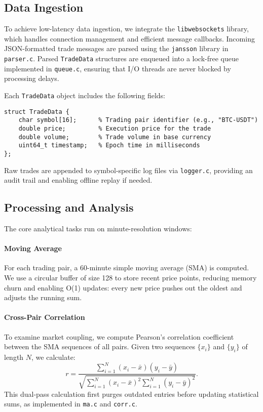 \documentclass{article}
\begin{document}
\subsection{Data Ingestion}
To achieve low-latency data ingestion, we integrate the \texttt{libwebsockets} library, which handles connection management and efficient message callbacks. Incoming JSON-formatted trade messages are parsed using the \texttt{jansson} library in \texttt{parser.c}. Parsed \texttt{TradeData} structures are enqueued into a lock-free queue implemented in \texttt{queue.c}, ensuring that I/O threads are never blocked by processing delays.

Each \texttt{TradeData} object includes the following fields:
\begin{verbatim}
struct TradeData {
    char symbol[16];      % Trading pair identifier (e.g., "BTC-USDT")
    double price;         % Execution price for the trade
    double volume;        % Trade volume in base currency
    uint64_t timestamp;   % Epoch time in milliseconds
};
\end{verbatim}
Raw trades are appended to symbol-specific log files via \texttt{logger.c}, providing an audit trail and enabling offline replay if needed.

\subsection{Processing and Analysis}
The core analytical tasks run on minute-resolution windows:

\paragraph{Moving Average} For each trading pair, a 60-minute simple moving average (SMA) is computed. We use a circular buffer of size 128 to store recent price points, reducing memory churn and enabling O(1) updates: every new price pushes out the oldest and adjusts the running sum.

\paragraph{Cross-Pair Correlation} To examine market coupling, we compute Pearson's correlation coefficient between the SMA sequences of all pairs. Given two sequences $\{x_i\}$ and $\{y_i\}$ of length $N$, we calculate:
\[
r = \frac{\sum_{i=1}^N (x_i - \bar{x})(y_i - \bar{y})}{\sqrt{\sum_{i=1}^N (x_i - \bar{x})^2 \sum_{i=1}^N (y_i - \bar{y})^2}}.
\]
This dual-pass calculation first purges outdated entries before updating statistical sums, as implemented in \texttt{ma.c} and \texttt{corr.c}.
\end{document}
